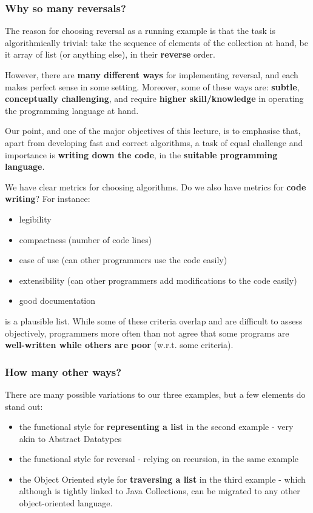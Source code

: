 \documentclass[a4paper, 12pt]{article}
\begin{document}
\subsubsection{ Why so many reversals? }

The reason for choosing reversal as a running example is that the task is algorithmically trivial: take the sequence of elements of the collection at hand, be it array of list (or anything else), in their \textbf{reverse} order.

However, there are \textbf{many different ways} for implementing reversal, and each makes perfect sense in some setting. Moreover, some of these ways are: \textbf{subtle}, \textbf{conceptually challenging}, and require \textbf{higher skill/knowledge} in operating the programming language at hand. 

Our point, and one of the major objectives of this lecture, is to emphasise that, apart from developing fast and correct algorithms, a task of equal challenge and importance is \textbf{writing down the code}, in the \textbf{suitable programming language}.

We have clear metrics for choosing algorithms. Do we also have metrics for \textbf{code writing}? For instance:
  \begin{itemize}
  	\item  legibility
  	\item  compactness (number of code lines)
  	\item  ease of use (can other programmers use the code easily)
  	\item  extensibility (can other programmers add modifications to the code easily)
  	\item  good documentation
  \end{itemize}

is a plausible list. While some of these criteria overlap and are difficult to assess objectively, programmers more often than not agree that some programs are \textbf{well-written while others are poor} (w.r.t. some criteria).

\subsubsection{ How many other ways? }

There are many possible variations to our three examples, but a few elements do stand out:
  \begin{itemize}
  	\item  the functional style for \textbf{representing a list} in the second example - very akin to Abstract Datatypes
  	\item  the functional style for reversal - relying on recursion, in the same example
  	\item  the Object Oriented style for \textbf{traversing a list} in the third example - which although is tightly linked to Java Collections, can be migrated to any other object-oriented language.
  \end{itemize}
\end{document}

